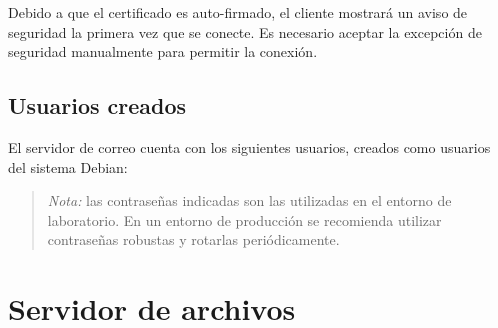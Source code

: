 Debido a que el certificado es auto-firmado, el cliente mostrará un aviso
de seguridad la primera vez que se conecte. Es necesario aceptar la excepción
de seguridad manualmente para permitir la conexión.


\subsection{Usuarios creados}

El servidor de correo cuenta con los siguientes usuarios, creados como
usuarios del sistema Debian:

\begin{table}[H]
\centering
\caption{Usuarios del servidor de correo}
\label{tab:usuarios-correo}
\end{table}

\begin{quote}
\small\textit{Nota:} las contraseñas indicadas son las utilizadas en el
entorno de laboratorio. En un entorno de producción se recomienda utilizar
contraseñas robustas y rotarlas periódicamente.
\end{quote}


\section{Servidor de archivos}

